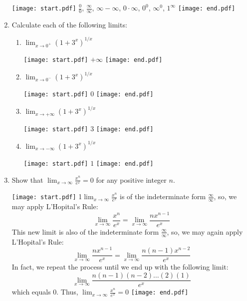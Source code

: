 \documentclass[12pt]{article}
\begin{document}
\begin{enumerate}
\texttt{[image: start.pdf]}
{{$\frac{0}{0}$, $\frac{\infty}{\infty}$, $\infty-\infty$, $0 \cdot \infty$, ${0}^{0}$, ${\infty}^{0}$, $1^{\infty}$}}
\texttt{[image: end.pdf]}


\item Calculate each of the following limits:

\begin{enumerate}

\item $\lim_{x \rightarrow 0^{+}}{(1+3^x)^{1/x}}$

\texttt{[image: start.pdf]}
{{$+\infty$}}
\texttt{[image: end.pdf]}


\item $\lim_{x \rightarrow 0^{-}}{(1+3^x)^{1/x}}$

\texttt{[image: start.pdf]}
{{$0$}}
\texttt{[image: end.pdf]}


\item $\lim_{x \rightarrow +\infty}{(1+3^x)^{1/x}}$

\texttt{[image: start.pdf]}
{{$3$}}
\texttt{[image: end.pdf]}


\item $\lim_{x \rightarrow -\infty}{(1+3^x)^{1/x}}$

\texttt{[image: start.pdf]}
{{$1$}}
\texttt{[image: end.pdf]}


\end{enumerate}

\newpage

\item Show that $\lim_{x \rightarrow \infty}{\frac{x^n}{e^x}}=0$ for any positive integer $n$.

\texttt{[image: start.pdf]}
{{{1\linewidth}{$\lim_{x \rightarrow \infty}{\frac{x^n}{e^x}}$ is of the indeterminate form $\frac{\infty}{\infty}$, so, we may apply L'Hopital's Rule:
$$\lim_{x \rightarrow \infty}{\frac{x^n}{e^x}}=\lim_{x \rightarrow \infty}{\frac{nx^{n-1}}{e^x}}$$
This new limit is also of the indeterminate form $\frac{\infty}{\infty}$, so, we may again apply L'Hopital's Rule:
$$\lim_{x \rightarrow \infty}{\frac{nx^{n-1}}{e^x}}=\lim_{x \rightarrow \infty}{\frac{n(n-1)x^{n-2}}{e^x}}$$
In fact, we repeat the process until we end up with the following limit:
$$\lim_{x \rightarrow \infty}{\frac{n(n-1)(n-2)\dots(2)(1)}{e^x}}$$
which equals 0.  Thus, $\lim_{x \rightarrow \infty}{\frac{x^n}{e^x}}=0$}}}
\texttt{[image: end.pdf]}



\end{enumerate}
\end{document}
